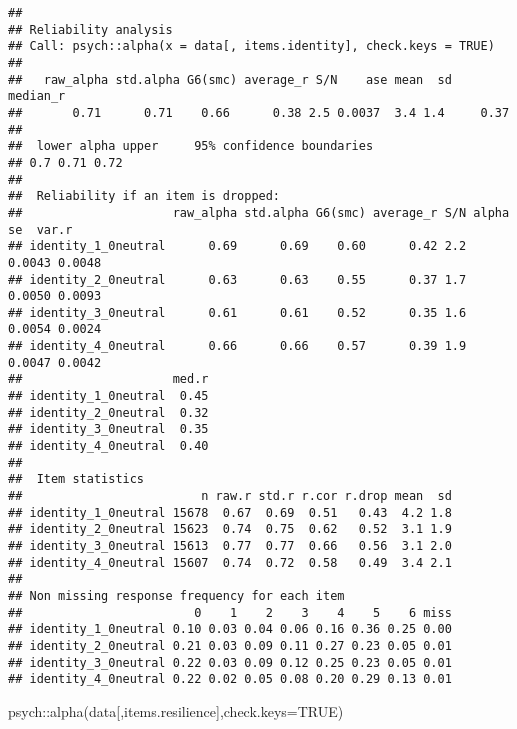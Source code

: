 \documentclass[
]{article}
\newenvironment{Shaded}{\begin{snugshade}}{\end{snugshade}}
\newcommand{\AttributeTok}[1]{\textcolor[rgb]{0.77,0.63,0.00}{#1}}
\newcommand{\ConstantTok}[1]{\textcolor[rgb]{0.00,0.00,0.00}{#1}}
\newcommand{\FunctionTok}[1]{\textcolor[rgb]{0.00,0.00,0.00}{#1}}
\newcommand{\NormalTok}[1]{#1}
\newcommand{\SpecialCharTok}[1]{\textcolor[rgb]{0.00,0.00,0.00}{#1}}
\begin{document}
\begin{verbatim}
## 
## Reliability analysis   
## Call: psych::alpha(x = data[, items.identity], check.keys = TRUE)
## 
##   raw_alpha std.alpha G6(smc) average_r S/N    ase mean  sd median_r
##       0.71      0.71    0.66      0.38 2.5 0.0037  3.4 1.4     0.37
## 
##  lower alpha upper     95% confidence boundaries
## 0.7 0.71 0.72 
## 
##  Reliability if an item is dropped:
##                     raw_alpha std.alpha G6(smc) average_r S/N alpha se  var.r
## identity_1_0neutral      0.69      0.69    0.60      0.42 2.2   0.0043 0.0048
## identity_2_0neutral      0.63      0.63    0.55      0.37 1.7   0.0050 0.0093
## identity_3_0neutral      0.61      0.61    0.52      0.35 1.6   0.0054 0.0024
## identity_4_0neutral      0.66      0.66    0.57      0.39 1.9   0.0047 0.0042
##                     med.r
## identity_1_0neutral  0.45
## identity_2_0neutral  0.32
## identity_3_0neutral  0.35
## identity_4_0neutral  0.40
## 
##  Item statistics 
##                         n raw.r std.r r.cor r.drop mean  sd
## identity_1_0neutral 15678  0.67  0.69  0.51   0.43  4.2 1.8
## identity_2_0neutral 15623  0.74  0.75  0.62   0.52  3.1 1.9
## identity_3_0neutral 15613  0.77  0.77  0.66   0.56  3.1 2.0
## identity_4_0neutral 15607  0.74  0.72  0.58   0.49  3.4 2.1
## 
## Non missing response frequency for each item
##                        0    1    2    3    4    5    6 miss
## identity_1_0neutral 0.10 0.03 0.04 0.06 0.16 0.36 0.25 0.00
## identity_2_0neutral 0.21 0.03 0.09 0.11 0.27 0.23 0.05 0.01
## identity_3_0neutral 0.22 0.03 0.09 0.12 0.25 0.23 0.05 0.01
## identity_4_0neutral 0.22 0.02 0.05 0.08 0.20 0.29 0.13 0.01
\end{verbatim}

\begin{Shaded}
\begin{Highlighting}[]
\NormalTok{psych}\SpecialCharTok{::}\FunctionTok{alpha}\NormalTok{(data[,items.resilience],}\AttributeTok{check.keys=}\ConstantTok{TRUE}\NormalTok{)}
\end{Highlighting}
\end{Shaded}
\end{document}
